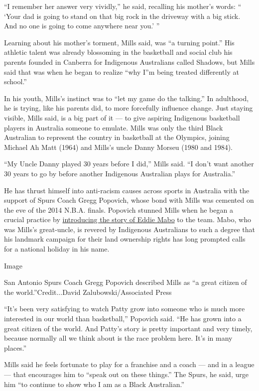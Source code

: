 ``I remember her answer very vividly,'' he said, recalling his mother's
words: `` `Your dad is going to stand on that big rock in the driveway
with a big stick. And no one is going to come anywhere near you.' ''

Learning about his mother's torment, Mills said, was ``a turning
point.'' His athletic talent was already blossoming in the basketball
and social club his parents founded in Canberra for Indigenous
Australians called Shadows, but Mills said that was when he began to
realize ``why I''m being treated differently at school.''

In his youth, Mills's instinct was to ``let my game do the talking.'' In
adulthood, he is trying, like his parents did, to more forcefully
influence change. Just staying visible, Mills said, is a big part of it
--- to give aspiring Indigenous basketball players in Australia someone
to emulate. Mills was only the third Black Australian to represent the
country in basketball at the Olympics, joining Michael Ah Matt (1964)
and Mills's uncle Danny Morseu (1980 and 1984).

``My Uncle Danny played 30 years before I did,'' Mills said. ``I don't
want another 30 years to go by before another Indigenous Australian
plays for Australia.''

He has thrust himself into anti-racism causes across sports in Australia
with the support of Spurs Coach Gregg Popovich, whose bond with Mills
was cemented on the eve of the 2014 N.B.A. finals. Popovich stunned
Mills when he began a crucial practice by
\href{https://www.si.com/nba/2015/03/24/patty-mills-australia-san-antonio-spurs-bala-gregg-popovich}{introducing
the story of Eddie Mabo} to the team. Mabo, who was Mills's great-uncle,
is revered by Indigenous Australians to such a degree that his landmark
campaign for their land ownership rights has long prompted calls for a
national holiday in his name.

Image

San Antonio Spurs Coach Gregg Popovich described Mills as ``a great
citizen of the world.''Credit...David Zalubowski/Associated Press

``It's been very satisfying to watch Patty grow into someone who is much
more interested in our world than basketball,'' Popovich said. ``He has
grown into a great citizen of the world. And Patty's story is pretty
important and very timely, because normally all we think about is the
race problem here. It's in many places.''

Mills said he feels fortunate to play for a franchise and a coach ---
and in a league --- that encourages him to ``speak out on these
things.'' The Spurs, he said, urge him ``to continue to show who I am as
a Black Australian.''

